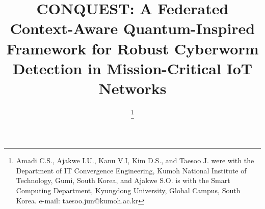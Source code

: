 \documentclass[conference]{IEEEtran}
\begin{document}
\title{%
CONQUEST: A Federated Context-Aware Quantum-Inspired Framework for Robust Cyberworm Detection in Mission-Critical IoT Networks
}

\author{

 \thanks{Amadi C.S., Ajakwe I.U.,  Kanu V.I, Kim D.S., and Taesoo J. were with the Department of IT Convergence
    Engineering, Kumoh National
    Institute of Technology, Gumi, South Korea, and Ajakwe S.O. is with the Smart Computing Department, Kyungdong University, Global Campus, South Korea. e-mail: taesoo.jun@kumoh.ac.kr}
}

\maketitle
\end{document}
